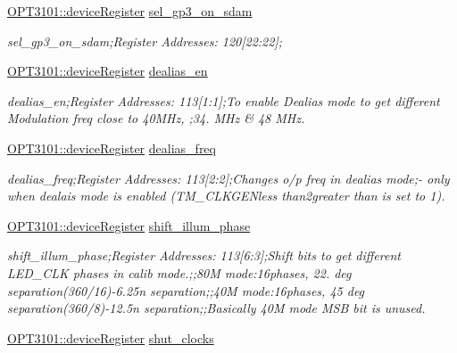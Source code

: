 \begin{DoxyCompactItemize}
\mbox{\hyperlink{class_o_p_t3101_1_1device_register}{O\+P\+T3101\+::device\+Register}} \mbox{\hyperlink{class_o_p_t3101_1_1registers_a2c3f2cecfca84f9cc11dde779753bb17}{sel\+\_\+gp3\+\_\+on\+\_\+sdam}}
\begin{DoxyCompactList}\small\item\em sel\+\_\+gp3\+\_\+on\+\_\+sdam;Register Addresses\+: 120\mbox{[}22\+:22\mbox{]}; \end{DoxyCompactList}\item 
\mbox{\hyperlink{class_o_p_t3101_1_1device_register}{O\+P\+T3101\+::device\+Register}} \mbox{\hyperlink{class_o_p_t3101_1_1registers_ac752e847ca54073862f6c642bd83790a}{dealias\+\_\+en}}
\begin{DoxyCompactList}\small\item\em dealias\+\_\+en;Register Addresses\+: 113\mbox{[}1\+:1\mbox{]};To enable Dealias mode to get different Modulation freq close to 40\+M\+Hz, ;34. M\+Hz \& 48 M\+Hz. \end{DoxyCompactList}\item 
\mbox{\hyperlink{class_o_p_t3101_1_1device_register}{O\+P\+T3101\+::device\+Register}} \mbox{\hyperlink{class_o_p_t3101_1_1registers_ab12f738990fa7202d760daca80be5e22}{dealias\+\_\+freq}}
\begin{DoxyCompactList}\small\item\em dealias\+\_\+freq;Register Addresses\+: 113\mbox{[}2\+:2\mbox{]};Changes o/p freq in dealias mode;-\/ only when dealais mode is enabled (T\+M\+\_\+\+C\+L\+K\+G\+E\+Nless than2greater than is set to \textquotesingle{}1\textquotesingle{}). \end{DoxyCompactList}\item 
\mbox{\hyperlink{class_o_p_t3101_1_1device_register}{O\+P\+T3101\+::device\+Register}} \mbox{\hyperlink{class_o_p_t3101_1_1registers_a18539cc6fd63ce4f504fcf16b1e48f31}{shift\+\_\+illum\+\_\+phase}}
\begin{DoxyCompactList}\small\item\em shift\+\_\+illum\+\_\+phase;Register Addresses\+: 113\mbox{[}6\+:3\mbox{]};Shift bits to get different L\+E\+D\+\_\+\+C\+LK phases in calib mode.;;80M mode\+:16phases, 22. deg separation(360/16)-\/6.\+25n separation;;40M mode\+:16phases, 45 deg separation(360/8)-\/12.\+5n separation;;Basically 40M mode M\+SB bit is unused. \end{DoxyCompactList}\item 
\mbox{\hyperlink{class_o_p_t3101_1_1device_register}{O\+P\+T3101\+::device\+Register}} \mbox{\hyperlink{class_o_p_t3101_1_1registers_ac3c618465f11b7742d57a755528163f6}{shut\+\_\+clocks}}

\end{DoxyCompactItemize}
